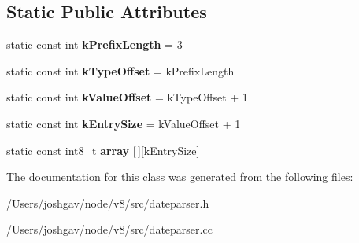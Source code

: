 \subsection*{Static Public Attributes}
\begin{DoxyCompactItemize}
\item 
static const int {\bfseries k\+Prefix\+Length} = 3\hypertarget{classv8_1_1internal_1_1_date_parser_1_1_keyword_table_a0e06d3b31c60bab69068487a0e6d596e}{}\label{classv8_1_1internal_1_1_date_parser_1_1_keyword_table_a0e06d3b31c60bab69068487a0e6d596e}

\item 
static const int {\bfseries k\+Type\+Offset} = k\+Prefix\+Length\hypertarget{classv8_1_1internal_1_1_date_parser_1_1_keyword_table_aa2999b289ffdf09af9a1018e89dd9254}{}\label{classv8_1_1internal_1_1_date_parser_1_1_keyword_table_aa2999b289ffdf09af9a1018e89dd9254}

\item 
static const int {\bfseries k\+Value\+Offset} = k\+Type\+Offset + 1\hypertarget{classv8_1_1internal_1_1_date_parser_1_1_keyword_table_a70b7be6ae71ffd1be9bffe75d2091677}{}\label{classv8_1_1internal_1_1_date_parser_1_1_keyword_table_a70b7be6ae71ffd1be9bffe75d2091677}

\item 
static const int {\bfseries k\+Entry\+Size} = k\+Value\+Offset + 1\hypertarget{classv8_1_1internal_1_1_date_parser_1_1_keyword_table_a9a3a5bc00d2ff379e4a6546b80214ce0}{}\label{classv8_1_1internal_1_1_date_parser_1_1_keyword_table_a9a3a5bc00d2ff379e4a6546b80214ce0}

\item 
static const int8\+\_\+t {\bfseries array} \mbox{[}$\,$\mbox{]}\mbox{[}k\+Entry\+Size\mbox{]}\hypertarget{classv8_1_1internal_1_1_date_parser_1_1_keyword_table_ab16ab22964e44f25ed76e6477f7d0703}{}\label{classv8_1_1internal_1_1_date_parser_1_1_keyword_table_ab16ab22964e44f25ed76e6477f7d0703}

\end{DoxyCompactItemize}


The documentation for this class was generated from the following files\+:\begin{DoxyCompactItemize}
\item 
/\+Users/joshgav/node/v8/src/dateparser.\+h\item 
/\+Users/joshgav/node/v8/src/dateparser.\+cc\end{DoxyCompactItemize}
